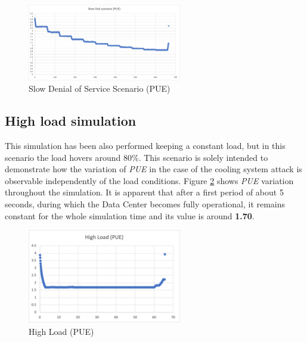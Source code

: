 \begin{figure}[h]
    \centering
    \includegraphics[width=0.6\textwidth]{chapters/images/slow_dos_pue.png}
    \caption{Slow Denial of Service Scenario (PUE)}
    \label{fig:slow_dos_pue}
\end{figure}

\subsection{High load simulation} \label{subsection:highload}
This simulation has been also performed keeping a constant load, but in this scenario the load hovers around 80\%. This scenario is solely intended to demonstrate how the variation of \emph{PUE} in the case of the cooling system attack is observable independently of the load conditions. Figure \ref{fig:high_load_pue} shows \emph{PUE} variation throughout the simulation. It is apparent that after a first period of about 5 seconds, during which the Data Center becomes fully operational, it remains constant for the whole simulation time and its value is around \textbf{1.70}. 
\begin{figure}[h]
    \centering
    \includegraphics[width=0.6\textwidth]{chapters/images/high_load_pue.png}
    \caption{High Load (PUE)}
    \label{fig:high_load_pue}
\end{figure}


